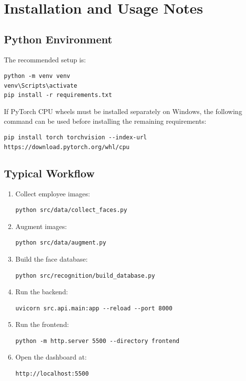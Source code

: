 \chapter{Installation and Usage Notes}

\section{Python Environment}

The recommended setup is:

\begin{lstlisting}[style=pythonstyle]
python -m venv venv
venv\Scripts\activate
pip install -r requirements.txt
\end{lstlisting}

If PyTorch CPU wheels must be installed separately on Windows, the following command can be used before installing the remaining requirements:

\begin{lstlisting}[style=pythonstyle]
pip install torch torchvision --index-url https://download.pytorch.org/whl/cpu
\end{lstlisting}

\section{Typical Workflow}

\begin{enumerate}
  \item Collect employee images:
\begin{lstlisting}[style=pythonstyle]
python src/data/collect_faces.py
\end{lstlisting}
  \item Augment images:
\begin{lstlisting}[style=pythonstyle]
python src/data/augment.py
\end{lstlisting}
  \item Build the face database:
\begin{lstlisting}[style=pythonstyle]
python src/recognition/build_database.py
\end{lstlisting}
  \item Run the backend:
\begin{lstlisting}[style=pythonstyle]
uvicorn src.api.main:app --reload --port 8000
\end{lstlisting}
  \item Run the frontend:
\begin{lstlisting}[style=pythonstyle]
python -m http.server 5500 --directory frontend
\end{lstlisting}
  \item Open the dashboard at:
\begin{lstlisting}[style=pythonstyle]
http://localhost:5500
\end{lstlisting}
\end{enumerate}

